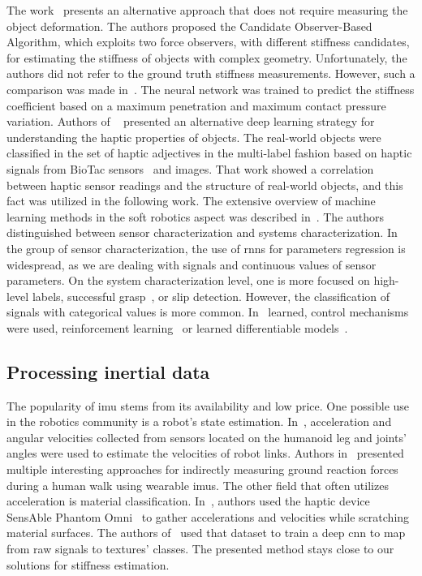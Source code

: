 \documentclass[a4paper, 10pt, twoside]{report}
\begin{document}
The work~\cite{stiff_from_force} presents an alternative approach that does not require measuring the object deformation. The authors proposed the Candidate Observer-Based Algorithm, which exploits two force observers, with different stiffness candidates, for estimating the stiffness of objects with complex geometry. Unfortunately, the authors did not refer to the ground truth stiffness measurements. However, such a comparison was made in~\cite{NN_stiff}. The neural network was trained to predict the stiffness coefficient based on a maximum penetration and maximum contact pressure variation. Authors of ~\cite{haptic_from_vision_and_biotac} presented an alternative deep learning strategy for understanding the haptic properties of objects. The real-world objects were classified in the set of haptic adjectives in the multi-label fashion based on haptic signals from BioTac sensors~\cite{biotac_sensor} and images. That work showed a correlation between haptic sensor readings and the structure of real-world objects, and this fact was utilized in the following work. The extensive overview of machine learning methods in the soft robotics aspect was described in~\cite{Chin20}. The authors distinguished between sensor characterization and systems characterization. In the group of sensor characterization, the use of \acrshort{rnn}s for parameters regression is widespread, as we are dealing with signals and continuous values of sensor parameters. On the system characterization level, one is more focused on high-level labels, successful grasp~\cite{8967558}, or slip detection. However, the classification of signals with categorical values is more common. In~\cite{Ibadi20} learned, control mechanisms were used, reinforcement learning~\cite{8531756} or learned differentiable models~\cite{9116011}.

\subsection{Processing inertial data}
\label{part:methods:materials:rw:imu}

The popularity of \acrshort{imu} stems from its availability and low price. One possible use in the robotics community is a robot's state estimation. In~\cite{humanoid}, acceleration and angular velocities collected from sensors located on the humanoid leg and joints' angles were used to estimate the velocities of robot links. Authors in~\cite{GRF} presented multiple interesting approaches for indirectly measuring ground reaction forces during a human walk using wearable \acrshort{imu}s. The other field that often utilizes acceleration is material classification. In~\cite{penn_haptix}, authors used the haptic device SensAble Phantom Omni~\cite{haptic_device} to gather accelerations and velocities while scratching material surfaces. The authors of~\cite{scratching} used that dataset to train a deep \acrfull{cnn} to map from raw signals to textures' classes. The presented method stays close to our solutions for stiffness estimation.
\end{document}
